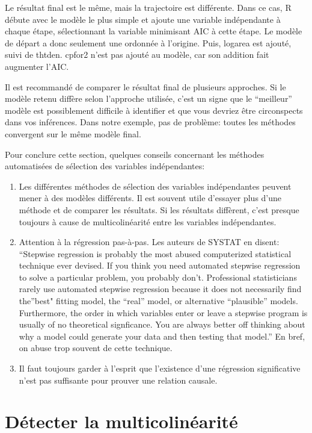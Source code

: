 \documentclass[12pt,]{book}
\providecommand{\tightlist}{%
  \setlength{\itemsep}{0pt}\setlength{\parskip}{0pt}}
\begin{document}
Le résultat final est le même, mais la trajectoire est différente. Dans ce cas, R débute avec le modèle le plus simple et ajoute une variable indépendante à chaque étape, sélectionnant la variable minimisant AIC à cette étape. Le modèle de départ a donc seulement une ordonnée à l'origine. Puis, logarea est ajouté, suivi de thtden. cpfor2 n'est pas ajouté au modèle, car son addition fait augmenter l'AIC.

Il est recommandé de comparer le résultat final de plusieurs approches. Si le modèle retenu diffère selon l'approche utilisée, c'est un signe que le ``meilleur'' modèle est possiblement difficile à identifier et que vous devriez être circonspects dans vos inférences. Dans notre exemple, pas de problème: toutes les méthodes convergent sur le même modèle final.

Pour conclure cette section, quelques conseils concernant les méthodes automatisées de sélection des variables indépendantes:

\begin{enumerate}
\def\labelenumi{\arabic{enumi}.}
\tightlist
\item
  Les différentes méthodes de sélection des variables indépendantes peuvent mener à des modèles différents. Il est souvent utile d'essayer plus d'une méthode et de comparer les résultats. Si les résultats diffèrent, c'est presque toujours à cause de multicolinéarité entre les variables indépendantes.
\item
  Attention à la régression pas-à-pas. Les auteurs de SYSTAT en disent: ``Stepwise regression is probably the most abused computerized statistical technique ever devised. If you think you need automated stepwise regression to solve a particular problem, you probably don't. Professional statisticians rarely use automated stepwise regression because it does not necessarily find the''best" fitting model, the ``real'' model, or alternative ``plausible'' models. Furthermore, the order in which variables enter or leave a stepwise program is usually of no theoretical signficance. You are always better off thinking about why a model could generate your data and then testing that model.'' En bref, on abuse trop souvent de cette technique.
\item
  Il faut toujours garder à l'esprit que l'existence d'une régression significative n'est pas suffisante pour prouver une relation causale.
\end{enumerate}

\hypertarget{duxe9tecter-la-multicolinuxe9arituxe9}{%
\section{Détecter la multicolinéarité}\label{duxe9tecter-la-multicolinuxe9arituxe9}}
\end{document}
